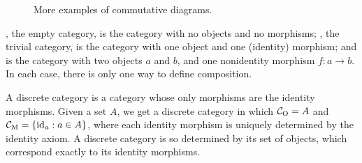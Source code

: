 \begin{remark}
\begin{figure}[htbp]
\begin{subfigure}{0.5\linewidth}
\begin{center}
      \end{center}
      \caption{}
      \label{fig:commutative-squares}
    \end{subfigure}
    \caption{More examples of commutative diagrams.}
    \label{fig:commutative-diagrams}
  \end{figure}

\end{remark}

\begin{example}
  \label{ex:trivial-categories}



  , the empty category, is the category with no objects and
  no morphisms; , the trivial category, is the category with
  one object and one (identity) morphism; and  is the
  category with two objects $a$ and $b$, and one nonidentity morphism
  $f: a \to b$. In each case, there is only one way to define
  composition.


\end{example}

\begin{example}
  \label{ex:discrete-category}



  A discrete category is a category whose only morphisms are the
  identity morphisms. Given a set $A$, we get a discrete category
   in which $\mathcal{C}_{\operatorname{O}} = A$ and $\mathcal{C}_{\operatorname{M}} = \{\operatorname{id}_{a}: a \in
  A\}$, where each identity morphism is uniquely determined by the
  identity axiom. A discrete category is so determined by its set of
  objects, which correspond exactly to its identity morphisms.

\end{example}

